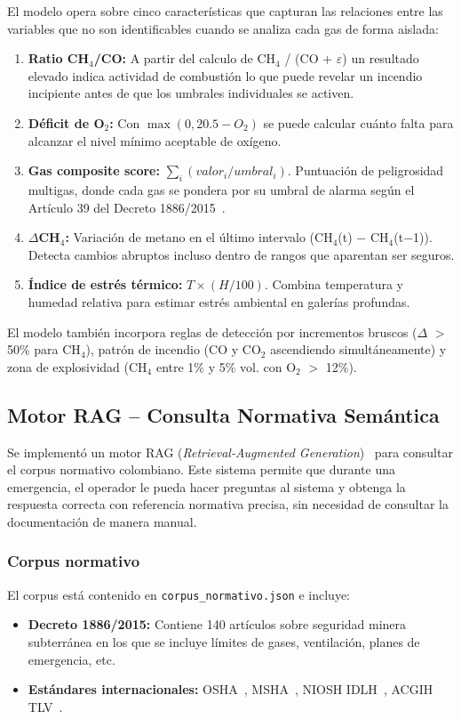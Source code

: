 \documentclass[journal,onecolumn]{IEEEtran}
\begin{document}
El modelo opera sobre cinco características que capturan las relaciones entre las variables que no son identificables cuando se analiza cada gas de forma aislada:

\begin{enumerate}
    \item \textbf{Ratio CH$_4$/CO:} A partir del calculo de CH$_4$ / (CO + $\varepsilon$) un resultado elevado indica actividad de combustión lo que puede revelar un incendio incipiente antes de que los umbrales individuales se activen.
    \item \textbf{Déficit de O$_2$:} Con $\max(0, 20.5 - O_2)$ se puede calcular cuánto falta para alcanzar el nivel mínimo aceptable de oxígeno.
    \item \textbf{Gas composite score:} $\sum_i (valor_i / umbral_i)$. Puntuación de peligrosidad multigas, donde cada gas se pondera por su umbral de alarma según el Artículo 39 del Decreto 1886/2015~\cite{decreto1886}.
    \item \textbf{$\Delta$CH$_4$:} Variación de metano en el último intervalo (CH$_4$(t) $-$ CH$_4$(t$-$1)). Detecta cambios abruptos incluso dentro de rangos que aparentan ser seguros.
    \item \textbf{Índice de estrés térmico:} $T \times (H/100)$. Combina temperatura y humedad relativa para estimar estrés ambiental en galerías profundas.
\end{enumerate}

El modelo también incorpora reglas de detección por incrementos bruscos ($\Delta$ $>$ 50\% para CH$_4$), patrón de incendio (CO y CO$_2$ ascendiendo simultáneamente) y zona de explosividad (CH$_4$ entre 1\% y 5\% vol. con O$_2$ $>$ 12\%).

\subsection{Motor RAG -- Consulta Normativa Semántica}
Se implementó un motor RAG (\textit{Retrieval-Augmented Generation})~\cite{lewis2020} para consultar el corpus normativo colombiano. Este sistema permite que durante una emergencia, el operador le pueda hacer preguntas al sistema y obtenga la respuesta correcta con referencia normativa precisa, sin necesidad de consultar la documentación de manera manual.

\subsubsection{Corpus normativo}
El corpus está contenido en \texttt{corpus\_normativo.json} e incluye:
\begin{itemize}
    \item \textbf{Decreto 1886/2015:} Contiene 140 artículos sobre seguridad minera subterránea en los que se incluye límites de gases, ventilación, planes de emergencia, etc.
    \item \textbf{Estándares internacionales:} OSHA~\cite{osha146}, MSHA~\cite{msha57}, NIOSH IDLH~\cite{nioshidlh}, ACGIH TLV~\cite{acghtlv}.
\end{itemize}
\end{document}
